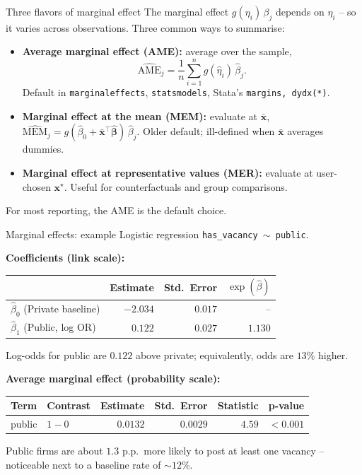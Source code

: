 \documentclass[10pt,ignorenonframetext,aspectratio=169]{beamer}
\newcommand{\bbeta}{\boldsymbol{\beta}}
\begin{document}
\begin{frame}{Three flavors of marginal effect}
The marginal effect $g(\eta_i)\,\beta_j$ depends on $\eta_i$ -- so it varies across observations. Three common ways to summarise:

\begin{itemize}
    \justifying
    \item \textbf{Average marginal effect (AME):} average over the sample,
    \[
    \widehat{\text{AME}}_j = \frac{1}{n}\sum_{i=1}^n g(\hat{\eta}_i)\,\hat{\beta}_j.
    \]
    Default in \texttt{marginaleffects}, \texttt{statsmodels}, Stata's \texttt{margins, dydx(*)}.
    \item \textbf{Marginal effect at the mean (MEM):} evaluate at $\bar{\mathbf{x}}$,
    $\widehat{\text{MEM}}_j = g(\hat{\beta}_0 + \bar{\mathbf{x}}^\top\hat{\bbeta})\,\hat{\beta}_j$. Older default; ill-defined when $\bar{\mathbf{x}}$ averages dummies.
    \item \textbf{Marginal effect at representative values (MER):} evaluate at user-chosen $\mathbf{x}^\star$. Useful for counterfactuals and group comparisons.
\end{itemize}

\medskip
For most reporting, the AME is the default choice.
\end{frame}


\begin{frame}[fragile]{Marginal effects: example}
Logistic regression \texttt{has\_vacancy $\sim$ public}.

\smallskip
\textbf{Coefficients (link scale):}
\begin{table}[ht]
\centering
\begin{tabular}{lrrr}
\hline
                                     & Estimate & Std.\ Error & $\exp(\hat{\beta})$ \\
\hline
$\hat{\beta}_0$ (Private baseline)   & $-2.034$ & $0.017$     & --                   \\
$\hat{\beta}_1$ (Public, log OR)     & $\phantom{-}0.122$  & $0.027$     & $1.130$              \\
\hline
\end{tabular}
\end{table}
Log-odds for public are $0.122$ above private; equivalently, odds are $13\%$ higher.

\medskip
\textbf{Average marginal effect (probability scale):}
\begin{table}[ht]
\centering
\begin{tabular}{llrrrr}
\hline
Term   & Contrast & Estimate & Std.\ Error & Statistic & p-value   \\
\hline
public & $1 - 0$  & $0.0132$ & $0.0029$    & $4.59$    & $<\!0.001$ \\
\hline
\end{tabular}
\end{table}
Public firms are about $1.3$ p.p.\ more likely to post at least one vacancy -- noticeable next to a baseline rate of $\sim\!12\%$.
\end{frame}
\end{document}
